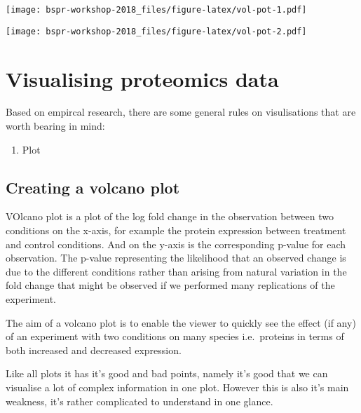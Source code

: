 \documentclass[12pt,]{book}
\newenvironment{Shaded}{\begin{snugshade}}{\end{snugshade}}
\newcommand{\KeywordTok}[1]{\textcolor[rgb]{0.13,0.29,0.53}{\textbf{#1}}}
\newcommand{\StringTok}[1]{\textcolor[rgb]{0.31,0.60,0.02}{#1}}
\newcommand{\OperatorTok}[1]{\textcolor[rgb]{0.81,0.36,0.00}{\textbf{#1}}}
\newcommand{\NormalTok}[1]{#1}
\providecommand{\tightlist}{%
  \setlength{\itemsep}{0pt}\setlength{\parskip}{0pt}}
\theoremstyle{definition}
\theoremstyle{definition}
\theoremstyle{definition}
\theoremstyle{remark}
\begin{document}
\texttt{[image: bspr-workshop-2018\_files/figure-latex/vol-pot-1.pdf]}

\begin{Shaded}
\end{Shaded}

\texttt{[image: bspr-workshop-2018\_files/figure-latex/vol-pot-2.pdf]}

\chapter{Visualising proteomics data}\label{visualising-proteomics-data}

Based on empircal research, there are some general rules on
visulisations that are worth bearing in mind:

\begin{enumerate}
\def\labelenumi{\arabic{enumi}.}
\tightlist
\item
  Plot
\end{enumerate}

\section{Creating a volcano plot}\label{creating-a-volcano-plot}

VOlcano plot is a plot of the log fold change in the observation between
two conditions on the x-axis, for example the protein expression between
treatment and control conditions. And on the y-axis is the corresponding
p-value for each observation. The p-value representing the likelihood
that an observed change is due to the different conditions rather than
arising from natural variation in the fold change that might be observed
if we performed many replications of the experiment.

The aim of a volcano plot is to enable the viewer to quickly see the
effect (if any) of an experiment with two conditions on many species
i.e.~proteins in terms of both increased and decreased expression.

Like all plots it has it's good and bad points, namely it's good that we
can visualise a lot of complex information in one plot. However this is
also it's main weakness, it's rather complicated to understand in one
glance.
\end{document}
